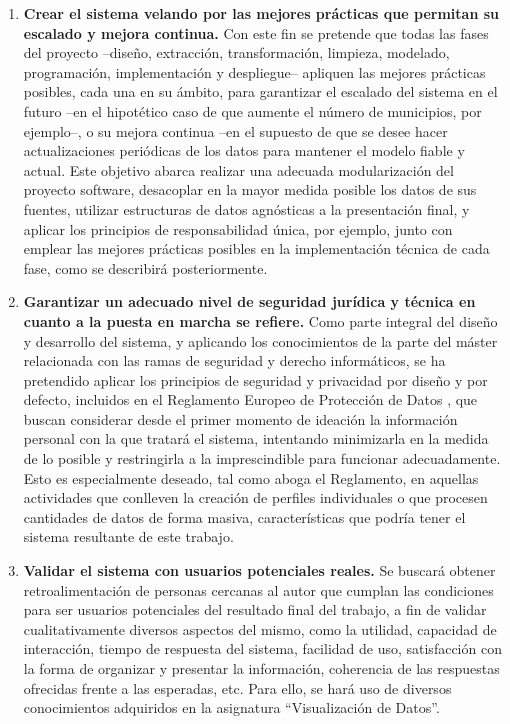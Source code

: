 \begin{enumerate}
    \item \textbf{Crear el sistema velando por las mejores prácticas que permitan su escalado y mejora continua.} Con este fin se pretende que todas las fases del proyecto –diseño, extracción, transformación, limpieza, modelado, programación, implementación y despliegue– apliquen las mejores prácticas posibles, cada una en su ámbito, para garantizar el escalado del sistema en el futuro –en el hipotético caso de que aumente el número de municipios, por ejemplo–, o su mejora continua –en el supuesto de que se desee hacer actualizaciones periódicas de los datos para mantener el modelo fiable y actual. Este objetivo abarca realizar una adecuada modularización del proyecto software, desacoplar en la mayor medida posible los datos de sus fuentes, utilizar estructuras de datos agnósticas a la presentación final, y aplicar los principios de responsabilidad única, por ejemplo, junto con emplear las mejores prácticas posibles en la implementación técnica de cada fase, como se describirá posteriormente.
    \item \textbf{Garantizar un adecuado nivel de seguridad jurídica y técnica en cuanto a la puesta en marcha se refiere.} Como parte integral del diseño y desarrollo del sistema, y aplicando los conocimientos de la parte del máster relacionada con las ramas de seguridad y derecho informáticos, se ha pretendido aplicar los principios de seguridad y privacidad por diseño y por defecto, incluidos en el Reglamento Europeo de Protección de Datos \cite{aepd}, que buscan considerar desde el primer momento de ideación la información personal con la que tratará el sistema, intentando minimizarla en la medida de lo posible y restringirla a la imprescindible para funcionar adecuadamente. Esto es especialmente deseado, tal como aboga el Reglamento, en aquellas actividades que conlleven la creación de perfiles individuales o que procesen cantidades de datos de forma masiva, características que podría tener el sistema resultante de este trabajo.
    \item \textbf{Validar el sistema con usuarios potenciales reales.} Se buscará obtener retroalimentación de personas cercanas al autor que cumplan las condiciones para ser usuarios potenciales del resultado final del trabajo, a fin de validar cualitativamente diversos aspectos del mismo, como la utilidad, capacidad de interacción, tiempo de respuesta del sistema, facilidad de uso, satisfacción con la forma de organizar y presentar la información, coherencia de las respuestas ofrecidas frente a las esperadas, etc. Para ello, se hará uso de diversos conocimientos adquiridos en la asignatura ``Visualización de Datos''.
    
\end{enumerate}